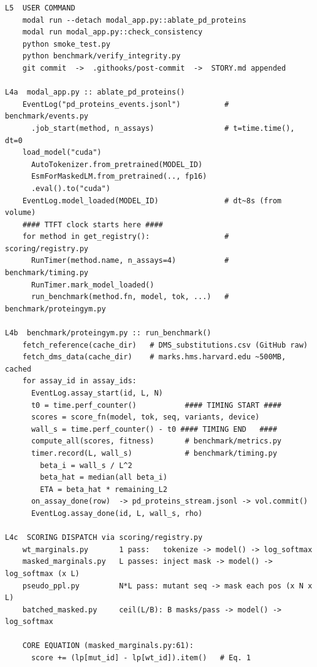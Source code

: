 \documentclass[11pt,a4paper]{article}
\begin{document}
\begin{lstlisting}[style=shell,caption={%
  Complete call chain from user command to compiled PTX kernel.
  Timing instruments shown at each level. All bold-named Python files
  are in the repo; library files are in \texttt{.venv/}.
}]
L5  USER COMMAND
    modal run --detach modal_app.py::ablate_pd_proteins
    modal run modal_app.py::check_consistency
    python smoke_test.py
    python benchmark/verify_integrity.py
    git commit  ->  .githooks/post-commit  ->  STORY.md appended

L4a  modal_app.py :: ablate_pd_proteins()
    EventLog("pd_proteins_events.jsonl")          # benchmark/events.py
      .job_start(method, n_assays)                # t=time.time(), dt=0
    load_model("cuda")
      AutoTokenizer.from_pretrained(MODEL_ID)
      EsmForMaskedLM.from_pretrained(.., fp16)
      .eval().to("cuda")
    EventLog.model_loaded(MODEL_ID)               # dt~8s (from volume)
    #### TTFT clock starts here ####
    for method in get_registry():                 # scoring/registry.py
      RunTimer(method.name, n_assays=4)           # benchmark/timing.py
      RunTimer.mark_model_loaded()
      run_benchmark(method.fn, model, tok, ...)   # benchmark/proteingym.py

L4b  benchmark/proteingym.py :: run_benchmark()
    fetch_reference(cache_dir)   # DMS_substitutions.csv (GitHub raw)
    fetch_dms_data(cache_dir)    # marks.hms.harvard.edu ~500MB, cached
    for assay_id in assay_ids:
      EventLog.assay_start(id, L, N)
      t0 = time.perf_counter()           #### TIMING START ####
      scores = score_fn(model, tok, seq, variants, device)
      wall_s = time.perf_counter() - t0 #### TIMING END   ####
      compute_all(scores, fitness)       # benchmark/metrics.py
      timer.record(L, wall_s)            # benchmark/timing.py
        beta_i = wall_s / L^2
        beta_hat = median(all beta_i)
        ETA = beta_hat * remaining_L2
      on_assay_done(row)  -> pd_proteins_stream.jsonl -> vol.commit()
      EventLog.assay_done(id, L, wall_s, rho)

L4c  SCORING DISPATCH via scoring/registry.py
    wt_marginals.py       1 pass:   tokenize -> model() -> log_softmax
    masked_marginals.py   L passes: inject mask -> model() -> log_softmax (x L)
    pseudo_ppl.py         N*L pass: mutant seq -> mask each pos (x N x L)
    batched_masked.py     ceil(L/B): B masks/pass -> model() -> log_softmax

    CORE EQUATION (masked_marginals.py:61):
      score += (lp[mut_id] - lp[wt_id]).item()   # Eq. 1


\end{lstlisting}
\end{document}
